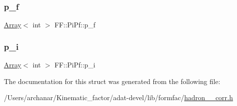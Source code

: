 \subsubsection{\texorpdfstring{p\_f}{p\_f}}
{\footnotesize\ttfamily \mbox{\hyperlink{classXMLArray_1_1Array}{Array}}$<$ int $>$ F\+F\+::\+Pi\+Pf\+::p\+\_\+f}

\mbox{\label{structFF_1_1PiPf_a740b500d8919567a75f3b1d1cb83241f}} 
\subsubsection{\texorpdfstring{p\_i}{p\_i}}
{\footnotesize\ttfamily \mbox{\hyperlink{classXMLArray_1_1Array}{Array}}$<$ int $>$ F\+F\+::\+Pi\+Pf\+::p\+\_\+i}



The documentation for this struct was generated from the following file\+:\begin{DoxyCompactItemize}
\item 
/\+Users/archanar/\+Kinematic\+\_\+factor/adat-\/devel/lib/formfac/\mbox{\hyperlink{adat-devel_2lib_2formfac_2hadron__3pt__corr_8h}{hadron\+\_\+3pt\+\_\+corr.\+h}}\end{DoxyCompactItemize}
